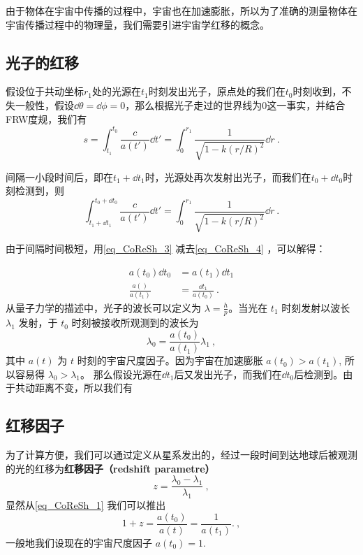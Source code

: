 \begin{issues}
\issueMissDepend
\end{issues}

由于物体在宇宙中传播的过程中，宇宙也在加速膨胀，所以为了准确的测量物体在宇宙传播过程中的物理量，我们需要引进宇宙学红移的概念。

\subsection{光子的红移}
假设位于共动坐标$r_1$处的光源在$t_1$时刻发出光子，原点处的我们在$t_0$时刻收到，不失一般性，假设$\dd\theta=\dd\phi=0$，那么根据光子走过的世界线为$0$这一事实，并结合FRW度规，我们有
\begin{equation}\label{eq_CoReSh_4}
s=\int^{t_0}_{t_1}\frac{c}{a(t')}\dd t'=\int_0^{r_1}\frac{1}{\sqrt{1-k(r/R)^2}}\dd r~.
\end{equation}

间隔一小段时间后，即在$t_1+\dd t_1$时，光源处再次发射出光子，而我们在$t_0+\dd t_0$时刻检测到，则
\begin{equation}\label{eq_CoReSh_3}
\int^{t_0+\dd t_0}_{t_1+\dd t_1}\frac{c}{a(t')}\dd t'=\int_0^{r_1}\frac{1}{\sqrt{1-k(r/R)^2}}\dd r~.
\end{equation}

由于间隔时间极短，用\autoref{eq_CoReSh_3} 减去\autoref{eq_CoReSh_4} ，可以解得：

\begin{equation}
\begin{aligned}
a(t_0)\dd t_0&=a(t_1)\dd t_1\\
\frac{a()}{a(t_1)}&=\frac{\dd t_1}{a(t_0)}~.
\end{aligned}
\end{equation}
从量子力学的描述中，光子的波长可以定义为 $\lambda=\frac{h}{p}$。当光在 $t_1$ 时刻发射以波长 $\lambda_1$ 发射，于 $t_0$ 时刻被接收所观测到的波长为
\begin{equation}\label{eq_CoReSh_1}
\lambda_0=\frac{a(t_0)}{a(t_1)}\lambda_1~,
\end{equation}
其中 $a(t)$ 为 $t$ 时刻的宇宙尺度因子。因为宇宙在加速膨胀 $a(t_0)>a(t_1)$, 所以容易得 $\lambda_0>\lambda_1$。
那么假设光源在$\dd t_1$后又发出光子，而我们在$\dd t_0$后检测到。由于共动距离不变，所以我们有
\subsection{红移因子}
为了计算方便，我们可以通过定义从星系发出的，经过一段时间到达地球后被观测的光的红移为\textbf{红移因子（redshift parametre）}
\begin{equation}
z=\frac{\lambda_0-\lambda_1}{\lambda_1}~,
\end{equation}
显然从\autoref{eq_CoReSh_1} 我们可以推出
\begin{equation}
1+z=\frac{a(t_0)}{a(t)}=\frac{1}{a(t_1)}. \label{eq_CoReSh_2}~,
\end{equation}
一般地我们设现在的宇宙尺度因子 $a(t_0)=1$.

